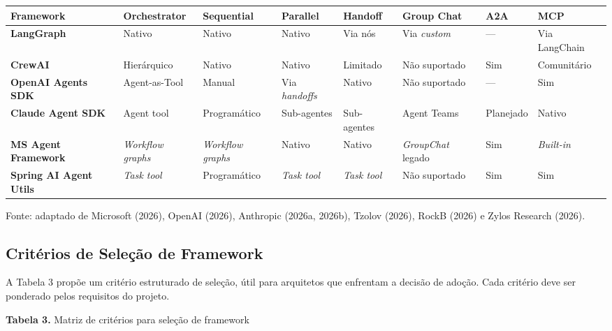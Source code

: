 \documentclass[12pt,a4paper]{article}
\begin{document}
\begin{center}
{\footnotesize
\setlength{\tabcolsep}{4pt}
\begin{tabularx}{\linewidth}{>{\raggedright\arraybackslash}X>{\centering\arraybackslash}X>{\centering\arraybackslash}X>{\centering\arraybackslash}X>{\centering\arraybackslash}X>{\centering\arraybackslash}X>{\centering\arraybackslash}X>{\centering\arraybackslash}X}
\toprule
\textbf{Framework} & \textbf{Orchestrator} & \textbf{Sequential} & \textbf{Parallel} & \textbf{Handoff} & \textbf{Group Chat} & \textbf{A2A} & \textbf{MCP} \\
\midrule
\textbf{LangGraph} & Nativo & Nativo & Nativo & Via nós & Via \textit{custom} & — & Via LangChain \\
\textbf{CrewAI} & Hierárquico & Nativo & Nativo & Limitado & Não suportado & Sim & Comunitário \\
\textbf{OpenAI Agents SDK} & Agent-as-Tool & Manual & Via \textit{handoffs} & Nativo & Não suportado & — & Sim \\
\textbf{Claude Agent SDK} & Agent tool & Programático & Sub-agentes & Sub-agentes & Agent Teams & Planejado & Nativo \\
\textbf{MS Agent Framework} & \textit{Workflow graphs} & \textit{Workflow graphs} & Nativo & Nativo & \textit{GroupChat} legado & Sim & \textit{Built-in} \\
\textbf{Spring AI Agent Utils} & \textit{Task tool} & Programático & \textit{Task tool} & \textit{Task tool} & Não suportado & Sim & Sim \\
\bottomrule
\end{tabularx}
}
\end{center}

Fonte: adaptado de Microsoft (2026), OpenAI (2026), Anthropic (2026a, 2026b), Tzolov (2026), RockB (2026) e Zylos Research (2026).

\subsection{Critérios de Seleção de Framework}

A Tabela 3 propõe um critério estruturado de seleção, útil para arquitetos que enfrentam a decisão de adoção. Cada critério deve ser ponderado pelos requisitos do projeto.

\textbf{Tabela 3.} Matriz de critérios para seleção de framework
\end{document}
